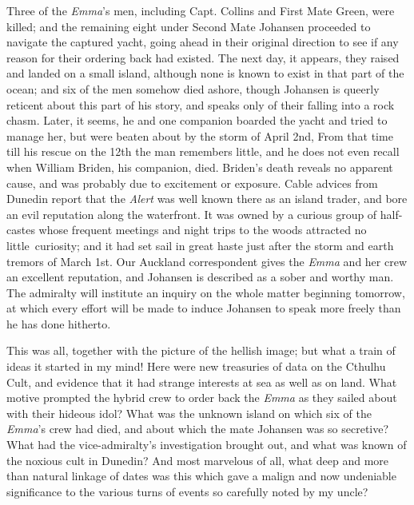 Three of the \emph{Emma}'s men, including Capt. Collins and First Mate Green,
were killed; and the remaining eight under Second Mate Johansen
proceeded to navigate the captured yacht, going ahead in their original
direction to see if any reason for their ordering back had existed. The
next day, it appears, they raised and landed on a small island, although
none is known to exist in that part of the ocean; and six of the men
somehow died ashore, though Johansen is queerly reticent about this part
of his story, and speaks only of their falling into a rock chasm. Later,
it seems, he and one companion boarded the yacht and tried to manage
her, but were beaten about by the storm of April 2nd, From that time
till his rescue on the 12th the man remembers little, and he does not
even recall when William Briden, his companion, died. Briden's death
reveals no apparent cause, and was probably due to excitement or
exposure. Cable advices from Dunedin report that the \emph{Alert} was well
known there as an island trader, and bore an evil reputation along the
waterfront. It was owned by a curious group of half-castes whose
frequent meetings and night trips to the woods attracted no little\est\
 curiosity; and it had set sail in great haste just after the storm and
earth tremors of March 1st. Our Auckland correspondent gives the \emph{Emma}
and her crew an excellent reputation, and Johansen is described as a
sober and worthy man. The admiralty will institute an inquiry on the
whole matter beginning tomorrow, at which every effort will be made to
induce Johansen to speak more freely than he has done hitherto.

This was all, together with the picture of the hellish image; but what a
train of ideas it started in my mind! Here were new treasuries of data
on the Cthulhu Cult, and evidence that it had strange interests at sea
as well as on land. What motive prompted the hybrid crew to order back
the \emph{Emma} as they sailed about with their hideous idol? What was the
unknown island on which six of the \emph{Emma}'s crew had died, and about which
the mate Johansen was so secretive? What had the vice-admiralty's
investigation brought out, and what was known of the noxious cult in
Dunedin? And most marvelous of all, what deep and more than natural
linkage of dates was this which gave a malign and now undeniable
significance to the various turns of events so carefully noted by my
uncle?

